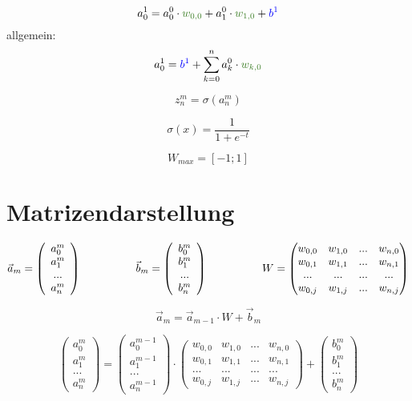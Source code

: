 \documentclass{article}
\begin{document}
\[ a_0^1 = a_0^0 \cdot \textcolor{OliveGreen}{w_{0,0}} + a_1^0 \cdot \textcolor{OliveGreen}{w_{1,0}} + \textcolor{blue}{b^1} \]
allgemein:
\[  a_0^1 = \textcolor{blue}{b^1} + \sum_{k=0}^{n} a_k^0 \cdot \textcolor{OliveGreen}{w_{k,0}}  \]

\[z_n^m = \sigma(a_n^m)\]

\[\sigma(x) = \frac{1}{1 + e^{-t}}\]

\[W_{max} = [-1;1]\]


\section{Matrizendarstellung}

\[ \vec{a}_m = \left(\begin{array}{c} a_0^m \\ a_1^m \\ ... \\ a_n^m \end{array}\right) 
\kern 50pt
\vec{b}_m = \left(\begin{array}{c} b_0^m \\ b_1^m \\ ... \\ b_n^m \end{array}\right) 
\kern 50pt
W = \begin{pmatrix}
    w_{0,0} & w_{1,0} & ... & w_{n,0} \\
    w_{0,1} & w_{1,1} & ... & w_{n,1} \\
    ... & ... & ... & ... \\
    w_{0,j} & w_{1,j} & ... & w_{n,j}
\end{pmatrix} \]

\[ \vec{a}_m = \vec{a}_{m-1} \cdot W + \vec{b}_m \]

\[ 
\left(\begin{array}{c} a_0^m \\ a_1^m \\ ... \\ a_n^m \end{array}\right)
=
\left(\begin{array}{c} a_0^{m-1} \\ a_1^{m-1} \\ ... \\ a_n^{m-1} \end{array}\right)
\cdot
\begin{pmatrix}
    w_{0,0} & w_{1,0} & ... & w_{n,0} \\
    w_{0,1} & w_{1,1} & ... & w_{n,1} \\
    ... & ... & ... & ... \\
    w_{0,j} & w_{1,j} & ... & w_{n,j}
\end{pmatrix}
+
\left(\begin{array}{c} b_0^m \\ b_1^m \\ ... \\ b_n^m \end{array}\right)
 \]
\end{document}
